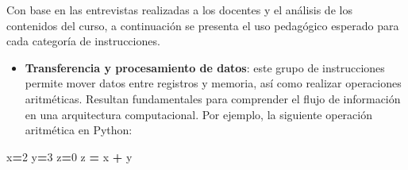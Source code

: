 \documentclass[12pt,oneside]{templates/unerthesis}
\newenvironment{Shaded}{\begin{snugshade}}{\end{snugshade}}
\newcommand{\DecValTok}[1]{\textcolor[rgb]{0.00,0.00,0.81}{#1}}
\newcommand{\NormalTok}[1]{#1}
\newcommand{\OperatorTok}[1]{\textcolor[rgb]{0.81,0.36,0.00}{\textbf{#1}}}
\providecommand{\tightlist}{%
  \setlength{\itemsep}{0pt}\setlength{\parskip}{0pt}}
\begin{document}
\begin{table}[!h]
\centering
\caption{\label{tab:saltoscondicionales}Saltos condicionales: instrucciones y condiciones}
\centering
{}
\end{table}

Con base en las entrevistas realizadas a los docentes y el análisis de los contenidos del curso, a continuación se presenta el uso pedagógico esperado para cada categoría de instrucciones.

\begin{itemize}
\tightlist
\item
  \textbf{Transferencia y procesamiento de datos}: este grupo de instrucciones permite mover datos entre registros y memoria, así como realizar operaciones aritméticas. Resultan fundamentales para comprender el flujo de información en una arquitectura computacional. Por ejemplo, la siguiente operación aritmética en Python:
\end{itemize}

\begin{Shaded}
\begin{Highlighting}[]
\NormalTok{x}\OperatorTok{=}\DecValTok{2}
\NormalTok{y}\OperatorTok{=}\DecValTok{3}
\NormalTok{z}\OperatorTok{=}\DecValTok{0}
\NormalTok{z }\OperatorTok{=}\NormalTok{ x }\OperatorTok{+}\NormalTok{ y}
\end{Highlighting}
\end{Shaded}
\end{document}
